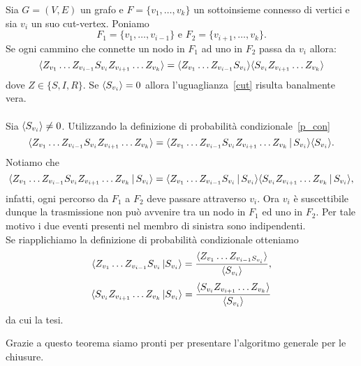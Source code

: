 \begin{thm}\label{th_cut-vertex}
Sia $G=(V,E)$ un grafo e $F=\{ v_1, \dots, v_k\}$ un sottoinsieme connesso di vertici e sia $v_i$ un suo cut-vertex. Poniamo  $$ F_1 = \{ v_1, \dots, v_{i-1}\} \text{ e }  F_2 =\{ v_{i+1}, \dots, v_k\}.$$ 
Se ogni cammino che connette un nodo in $F_1$ ad uno in $F_2$ passa da $v_i$ allora: 
\begin{equation}\label{cut}\langle  Z_{v_1}\dots Z_{v_{i-1}} S_{v_i} Z_{v_{i+1}} \dots Z_{v_k} \rangle = \langle  Z_{v_1}\dots Z_{v_{i-1}} S_{v_i} \rangle \langle S_{v_i}  Z_{v_{i+1}} \dots Z_{v_k} \rangle	
\end{equation}
dove $Z\in \{ S,I,R\}$. 
\proof  
Se $\langle S_{v_i} \rangle=0$ allora l'uguaglianza~\eqref{cut} risulta banalmente vera.\\ \\ 
Sia $\langle S_{v_i} \rangle\neq 0 $. Utilizzando la definizione di  probabilit\`a condizionale~\eqref{p_con}
$$ \langle  Z_{v_1}\dots Z_{v_{i-1}} S_{v_i} Z_{v_{i+1}}\dots Z_{v_k} \rangle = \langle  Z_{v_1}\dots Z_{v_{i-1}} S_{v_i} Z_{v_{i+1}}\dots Z_{v_k}\, \vert \, S_{v_i} \rangle \langle S_{v_i} \rangle.$$
Notiamo che $$ \langle  Z_{v_1}\dots Z_{v_{i-1}} S_{v_i} Z_{v_{i+1}}\dots Z_{v_k}\, \vert \, S_{v_i} \rangle = \langle  Z_{v_1}\dots Z_{v_{i-1}} S_{v_i} \, \vert\, S_{v_i} \rangle \langle S_{v_i}Z_{v_{i+1}}\dots Z_{v_k}\, \vert \, S_{v_i} \rangle,$$ 
infatti, ogni percorso da $F_1$ a $F_2$ deve passare attraverso $v_i$. Ora  $v_i$ \`e suscettibile dunque la trasmissione non pu\`o avvenire tra un nodo in $F_1$ ed uno in $F_2$. Per tale motivo i due eventi presenti nel membro di sinistra sono indipendenti.\\
Se riapplichiamo la definizione di probabilit\`a condizionale otteniamo  
$$ \langle  Z_{v_1} \dots Z_{v_{i-1}}S_{v_i} \, \vert S_{v_i} \rangle =\frac{ \langle Z_{v_1} \dots Z_{v_{i-1} S_{v_i}} \rangle}{\langle  S_{v_i} \rangle},$$
$$ \langle  S_{v_i} Z_{v_{i+1}}\dots Z_{v_{k}} \, \vert S_{v_i} \rangle =\frac{ \langle S_{v_i}Z_{v_{i+1}} \dots Z_{v_{k}} \rangle}{\langle  S_{v_i} \rangle}$$
da cui la tesi.
\endproof
\end{thm}
Grazie a questo teorema siamo pronti per presentare l'algoritmo generale per le chiusure.
